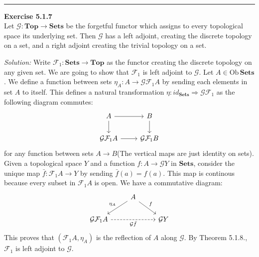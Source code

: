 \documentclass[a4paper, 12pt]{article}
\newenvironment{problem}[2][Exercise]
    { \begin{mdframed}[backgroundcolor=gray!20] \textbf{#1 #2} \\}
    {  \end{mdframed}}
\newenvironment{solution}
    {\textit{Solution:}}
    {}
\begin{document}
\\ 
\noindent\rule{7in}{2.8pt}
\begin{problem}{5.1.7}
Let \(\mathcal{G}:\mathbf{Top}\rightarrow \mathbf{Sets}\) be the forgetful functor which assigns to every topological space its underlying set. Then \(\mathcal{G}\) has a left adjoint, creating the discrete topology on a 
set, and a right adjoint creating the trivial topology on a set.	
\end{problem}
\begin{solution}
Write \(\mathcal{F}_1:\mathbf{Sets}\rightarrow \mathbf{Top}\) as the functor creating the discrete topology on any given set. We are going to show that \(\mathcal{F}_1\) is left adjoint to \(\mathcal{G}\). Let \(A\in \text{Ob}\, \mathbf{Sets}\). We 
define a function between sets \(\eta_A:A\rightarrow \mathcal{G}\mathcal{F}_1 A\) by sending each elements in set \(A\) to itself. This defines a natural transformation \(\eta:id_{\mathbf{Sets}}\Rightarrow \mathcal{G}\mathcal{F}_1\) as the following diagram commutes:
\[\begin{tikzcd}
	A & B \\
	{\mathcal{G}\mathcal{F}_1 A} & {\mathcal{G}\mathcal{F}_1 B}
	\arrow[from=1-1, to=1-2]
	\arrow[from=1-1, to=2-1]
	\arrow[from=1-2, to=2-2]
	\arrow[from=2-1, to=2-2]
\end{tikzcd}\]
for any function between sets \(A\rightarrow B\)(The vertical maps are just identity on sets). Given a topological space \(Y\) and a function \(f:A\rightarrow \mathcal{G}Y\) in \(\mathbf{Sets}\),  consider the unique map 
\(\bar{f}:\mathcal{F}_1 A\rightarrow Y\) by sending \(\bar{f}(a)=f(a)\). This map is continous because every subset in \(\mathcal{F}_1 A\) is open. We have a commutative diagram:
\[\begin{tikzcd}
	& A \\
	{\mathcal{G}\mathcal{F}_1A} && {\mathcal{G}Y}
	\arrow["{\eta_A}"', from=1-2, to=2-1]
	\arrow["f", from=1-2, to=2-3]
	\arrow["{\mathcal{G}\bar{f}}"', dashed, from=2-1, to=2-3]
\end{tikzcd}\]
This proves that \((\mathcal{F}_1 A,\eta_A)\) is the reflection of \(A\) along \(\mathcal{G}\). By Theorem 5.1.8., \(\mathcal{F}_1\) is left adjoint to \(\mathcal{G}\).
\par 

\end{solution}
\end{document}
